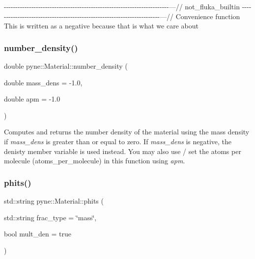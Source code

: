 -\/-\/-\/-\/-\/-\/-\/-\/-\/-\/-\/-\/-\/-\/-\/-\/-\/-\/-\/-\/-\/-\/-\/-\/-\/-\/-\/-\/-\/-\/-\/-\/-\/-\/-\/-\/-\/-\/-\/-\/-\/-\/-\/-\/-\/-\/-\/-\/-\/-\/-\/-\/-\/-\/-\/-\/-\/-\/-\/-\/-\/-\/-\/-\/-\/-\/-\/-\/-\/-\/-\/-\/---// not\+\_\+fluka\+\_\+builtin -\/-\/-\/-\/-\/-\/-\/-\/-\/-\/-\/-\/-\/-\/-\/-\/-\/-\/-\/-\/-\/-\/-\/-\/-\/-\/-\/-\/-\/-\/-\/-\/-\/-\/-\/-\/-\/-\/-\/-\/-\/-\/-\/-\/-\/-\/-\/-\/-\/-\/-\/-\/-\/-\/-\/-\/-\/-\/-\/-\/-\/-\/-\/-\/-\/-\/-\/-\/-\/-\/-\/-\/---// Convenience function This is written as a negative because that is what we care about \mbox{\label{classpyne_1_1_material_a25bb43110ee9bd275cbe534c95713acc}} 
\subsubsection{\texorpdfstring{number\+\_\+density()}{number\_density()}}
{\footnotesize\ttfamily double pyne\+::\+Material\+::number\+\_\+density (\begin{DoxyParamCaption}\item[{double}]{mass\+\_\+dens = {\ttfamily -\/1.0},  }\item[{double}]{apm = {\ttfamily -\/1.0} }\end{DoxyParamCaption})}

Computes and returns the number density of the material using the mass density if {\itshape mass\+\_\+dens} is greater than or equal to zero. If {\itshape mass\+\_\+dens} is negative, the denisty member variable is used instead. You may also use / set the atoms per molecule (atoms\+\_\+per\+\_\+molecule) in this function using {\itshape apm}. \mbox{\label{classpyne_1_1_material_a3027c85c9910b73e6f4a8012db382532}} 
\subsubsection{\texorpdfstring{phits()}{phits()}}
{\footnotesize\ttfamily std\+::string pyne\+::\+Material\+::phits (\begin{DoxyParamCaption}\item[{std\+::string}]{frac\+\_\+type = {\ttfamily \char`\"{}mass\char`\"{}},  }\item[{bool}]{mult\+\_\+den = {\ttfamily true} }\end{DoxyParamCaption})}



